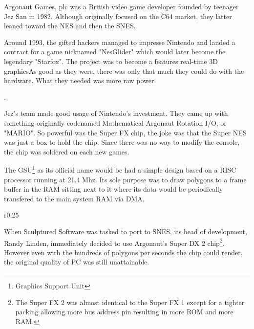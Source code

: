 Argonaut Games, plc was a British video game developer founded by teenager Jez San in 1982. Although originally focused on the C64 market, they latter leaned toward the NES and then the SNES.\\
\par Around 1993, the gifted hackers managed to impresse Nintendo and landed a contract for a game nicknamed "NesGlider" which would later become the legendary "Starfox". The project was to become a features real-time 3D graphicsAs good as they were, there was only that much they could do with the hardware. What they needed was more raw power.\\
\par
{}.\\
\par
Jez's team made good usage of Nintendo's investment. They came up with something originally codenamed Mathematical Argonaut Rotation I/O, or "MARIO". So powerful was the Super FX chip, the joke was that the Super NES was just a box to hold the chip. Since there was no way to modify the console, the chip was soldered on each new games.\\
\par
The GSU\footnote{Graphics Support Unit} as its official name would be had a simple design based on a RISC processor running at 21.4 Mhz. Its sole purpose was to draw polygons to a frame buffer in the RAM sitting next to it where its data would be periodically transfered to the main system RAM via DMA.\\
\par
{}
\par
\begin{wrapfigure}[11]{r}{0.25\textwidth}
\centering
{}
\end{wrapfigure}
When Sculptured Software was tasked to port \doom to SNES, its head of development, Randy Linden, immediately decided to use Argonaut's Super DX 2 chip\footnote{The Super FX 2 was almost identical to the Super FX 1 except for a tighter packing allowing more bus address pin resulting in more ROM and more RAM.}. However even with the hundreds of polygons per seconds the chip could render, the original quality of PC \doom was still unattainable.\\
